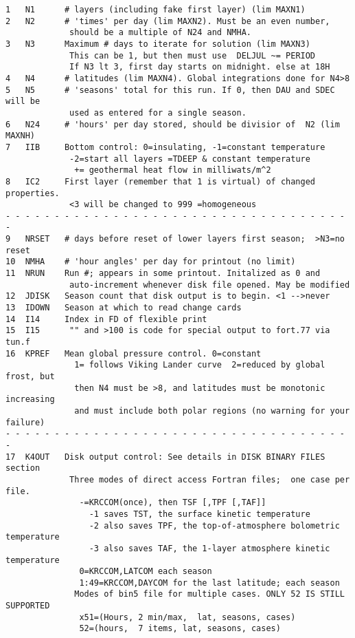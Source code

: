 \documentclass{article}
\begin{document}
\begin{verbatim}
1   N1      # layers (including fake first layer) (lim MAXN1)
2   N2      # 'times' per day (lim MAXN2). Must be an even number, 
             should be a multiple of N24 and NMHA.
3   N3      Maximum # days to iterate for solution (lim MAXN3)
             This can be 1, but then must use  DELJUL ~= PERIOD
             If N3 lt 3, first day starts on midnight. else at 18H 
4   N4      # latitudes (lim MAXN4). Global integrations done for N4>8
5   N5      # 'seasons' total for this run. If 0, then DAU and SDEC will be 
             used as entered for a single season.
6   N24     # 'hours' per day stored, should be divisior of  N2 (lim MAXNH)
7   IIB     Bottom control: 0=insulating, -1=constant temperature 
             -2=start all layers =TDEEP & constant temperature 
              += geothermal heat flow in milliwats/m^2
8   IC2     First layer (remember that 1 is virtual) of changed properties. 
             <3 will be changed to 999 =homogeneous
- - - - - - - - - - - - - - - - - - - - - - - - - - - - - - - - - - - - 
9   NRSET   # days before reset of lower layers first season;  >N3=no reset
10  NMHA    # 'hour angles' per day for printout (no limit)
11  NRUN    Run #; appears in some printout. Initalized as 0 and   
             auto-increment whenever disk file opened. May be modified
12  JDISK   Season count that disk output is to begin. <1 -->never
13  IDOWN   Season at which to read change cards
14  I14     Index in FD of flexible print
15  I15      "" and >100 is code for special output to fort.77 via tun.f
16  KPREF   Mean global pressure control. 0=constant
              1= follows Viking Lander curve  2=reduced by global frost, but
              then N4 must be >8, and latitudes must be monotonic increasing
              and must include both polar regions (no warning for your failure)
- - - - - - - - - - - - - - - - - - - - - - - - - - - - - - - - - - - - 
17  K4OUT   Disk output control: See details in DISK BINARY FILES section
             Three modes of direct access Fortran files;  one case per file.
               -=KRCCOM(once), then TSF [,TPF [,TAF]]
                 -1 saves TST, the surface kinetic temperature
                 -2 also saves TPF, the top-of-atmosphere bolometric temperature
                 -3 also saves TAF, the 1-layer atmosphere kinetic temperature
               0=KRCCOM,LATCOM each season
               1:49=KRCCOM,DAYCOM for the last latitude; each season
              Modes of bin5 file for multiple cases. ONLY 52 IS STILL SUPPORTED
               x51=(Hours, 2 min/max,  lat, seasons, cases)
               52=(hours,  7 items, lat, seasons, cases) 

\end{verbatim}
\end{document}
